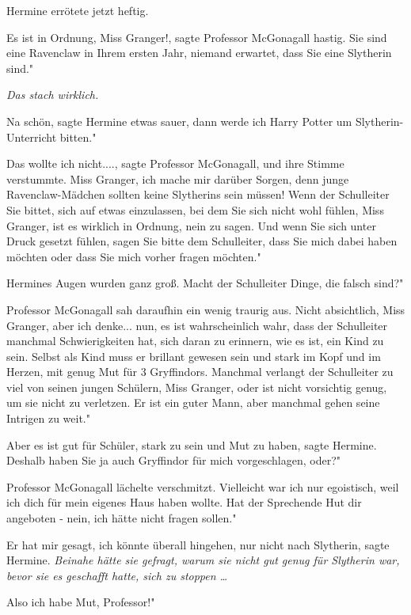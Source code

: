 Hermine errötete jetzt heftig.

\glqq{}Es ist in Ordnung, Miss Granger!\grqq{}, sagte Professor McGonagall
hastig. \glqq{}Sie sind eine Ravenclaw in Ihrem ersten Jahr, niemand erwartet,
dass Sie eine Slytherin sind."

\emph{Das stach wirklich.}

\glqq{}Na schön\grqq{}, sagte Hermine etwas sauer, \glqq{}dann werde ich Harry
Potter um Slytherin-Unterricht bitten."

\glqq{}Das wollte ich nicht....\grqq{}, sagte Professor McGonagall, und ihre
Stimme verstummte. \glqq{}Miss Granger, ich mache mir darüber Sorgen, denn junge
Ravenclaw-Mädchen sollten keine Slytherins sein müssen! Wenn der Schulleiter Sie
bittet, sich auf etwas einzulassen, bei dem Sie sich nicht wohl fühlen, Miss
Granger, ist es wirklich in Ordnung, nein zu sagen. Und wenn Sie sich unter
Druck gesetzt fühlen, sagen Sie bitte dem Schulleiter, dass Sie mich dabei haben
möchten oder dass Sie mich vorher fragen möchten."

Hermines Augen wurden ganz groß. \glqq{}Macht der Schulleiter Dinge, die falsch
sind?"

Professor McGonagall sah daraufhin ein wenig traurig aus. \glqq{}Nicht
absichtlich, Miss Granger, aber ich denke... nun, es ist wahrscheinlich wahr,
dass der Schulleiter manchmal Schwierigkeiten hat, sich daran zu erinnern, wie
es ist, ein Kind zu sein. Selbst als Kind muss er brillant gewesen sein und
stark im Kopf und im Herzen, mit genug Mut für 3 Gryffindors. Manchmal verlangt
der Schulleiter zu viel von seinen jungen Schülern, Miss Granger, oder ist nicht
vorsichtig genug, um sie nicht zu verletzen. Er ist ein guter Mann, aber
manchmal gehen seine Intrigen zu weit."

\glqq{}Aber es ist gut für Schüler, stark zu sein und Mut zu haben\grqq{}, sagte
Hermine. \glqq{}Deshalb haben Sie ja auch Gryffindor für mich vorgeschlagen,
oder?"

Professor McGonagall lächelte verschmitzt. \glqq{}Vielleicht war ich nur
egoistisch, weil ich dich für mein eigenes Haus haben wollte. Hat der Sprechende
Hut dir angeboten - nein, ich hätte nicht fragen sollen."

\glqq{}Er hat mir gesagt, ich könnte überall hingehen, nur nicht nach
Slytherin\grqq{}, sagte Hermine.
\emph{Beinahe hätte sie gefragt, warum sie nicht gut genug für Slytherin war,
bevor sie es geschafft hatte, sich zu stoppen …}

\glqq{}Also ich habe Mut, Professor!"

